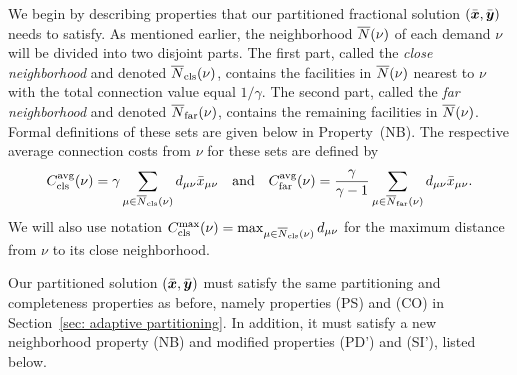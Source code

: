 We begin by describing properties that our partitioned fractional
solution $(\bar{\boldsymbol{x}},\bar{\boldsymbol{y}})$ needs to satisfy. As mentioned earlier, the neighborhood
${\overline{N}}(\nu)$ of each demand $\nu$ will be divided into two disjoint
parts.  The first part, called the \emph{close neighborhood} and denoted
${\overline{N}}_{\text{cls}}(\nu)$, contains the facilities in ${\overline{N}}(\nu)$ nearest to
$\nu$ with the total connection value equal $1/\gamma$. The second
part, called the \emph{far neighborhood} and denoted ${\overline{N}}_{\text{far}}(\nu)$, contains
the remaining facilities in ${\overline{N}}(\nu)$. Formal definitions of
these sets are given below in Property~(NB).  The respective average
connection costs from $\nu$ for these sets are defined by
%
\begin{equation*}
C_{\text{cls}}^{{\mbox{\scriptsize\rm avg}}}(\nu)=\gamma\sum_{\mu\in{\overline{N}}_{\text{cls}}(\nu)}
			d_{\mu\nu}{\bar x}_{\mu\nu} \quad\text{and}\quad
C_{\text{far}}^{{\mbox{\scriptsize\rm avg}}}(\nu)=\frac{\gamma}{\gamma-1}\sum_{\mu\in{\overline{N}}_{\text{far}}(\nu)}
d_{\mu\nu}{\bar x}_{\mu\nu}. 
\end{equation*}
%
We will also use notation
$C_{\text{cls}}^{\max}(\nu)=\max_{\mu\in{\overline{N}}_{\text{cls}}(\nu)} d_{\mu\nu}$ for the maximum
distance from $\nu$ to its close neighborhood.

Our partitioned solution $(\bar{\boldsymbol{x}},\bar{\boldsymbol{y}})$ must satisfy the same
partitioning and completeness properties as before, namely properties
(PS) and (CO) in Section~\ref{sec: adaptive partitioning}.  In
addition, it must satisfy a new neighborhood property (NB) and modified
properties (PD') and (SI'), listed below.

